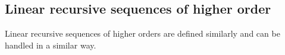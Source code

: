 

\setcounter{section}{1}
\setcounter{subsection}{3}
\setcounter{dfn}{4}

\subsection{Linear recursive sequences of higher order}
Linear recursive sequences of higher orders are defined similarly and can be handled in a similar way.


